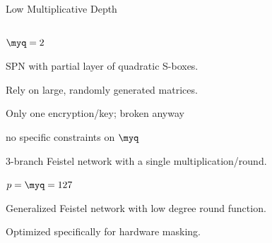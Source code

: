 \documentclass[presentation,aspectratio=1610]{beamer}
\begin{document}
\begin{frame}{Low Multiplicative Depth}
  
  \begin{columns}
    \begin{column}{0.6\textwidth}
      \begin{description}
        \setlength\itemsep{0.6cm}
      \item<1->[LowMC] \cite{EC:ARSTZ15} $\myq = 2$ 

        {\small SPN with partial layer of quadratic S-boxes.

          Rely on large, randomly generated  matrices.

        Only one encryption/key; broken anyway}
          
    \item<2->[Ciminion] \cite{EC:DGGK21} no specific constraints on $\myq$

      {\small 3-branch Feistel network with a single
        multiplication/round.}
          
    \item<3->[small-pSquare] \cite{EPRINT:GMMMS24} $p = \myq = 127$

      {\small Generalized Feistel network with low degree round function.

      Optimized specifically for hardware masking.}
      \end{description}
    \end{column}
    \hfill
    \begin{column}{0.35\textwidth}
    \end{column}
  \end{columns}
\end{frame}
\end{document}
